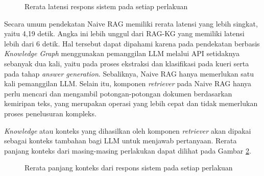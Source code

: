 \begin{figure}[H]
	\centering
	\caption{Rerata latensi respons sistem pada setiap perlakuan}
	\label{fig:latency-per-treatment}
\end{figure}

Secara umum pendekatan Naive RAG memiliki rerata latensi yang lebih singkat, yaitu 4,19 detik.
Angka ini lebih unggul dari RAG-KG yang memiliki latensi lebih dari 6 detik.
Hal tersebut dapat dipahami karena pada pendekatan berbasis \textit{Knowledge Graph} menggunakan pemanggilan LLM melalui API setidaknya sebanyak dua kali, yaitu pada proses ekstraksi dan klasifikasi pada kueri serta pada tahap \textit{answer generation}.
Sebaliknya, Naive RAG hanya memerlukan satu kali pemanggilan LLM.
Selain itu, komponen \textit{retriever} pada Naive RAG hanya perlu mencari dan mengambil potongan-potongan dokumen berdasarkan kemiripan teks, yang merupakan operasi yang lebih cepat dan tidak memerlukan proses penelusuran kompleks.

\textit{Knowledge} atau konteks yang dihasilkan oleh komponen \textit{retriever} akan dipakai sebagai konteks tambahan bagi LLM untuk menjawab pertanyaan.
Rerata panjang konteks dari masing-masing perlakukan dapat dilihat pada Gambar \ref{fig:context-length-per-treatment}.

\begin{figure}[H]
	\centering
	\caption{Rerata panjang konteks dari respons sistem pada setiap perlakuan}
	\label{fig:context-length-per-treatment}
\end{figure}

